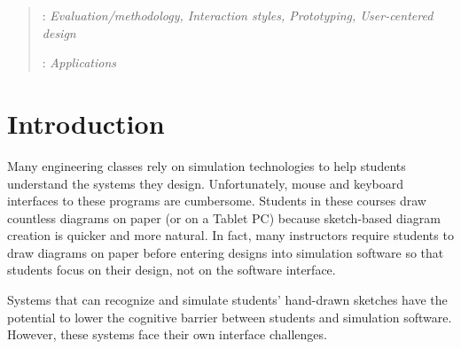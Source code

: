 \documentclass{egpubl}
\begin{document}
\begin{abstract}
\begin{classification} %
: \textit{Evaluation/methodology, Interaction styles, Prototyping, User-centered design}
\end{classification}

\begin{classification} %
: \textit{Applications}
\end{classification}




\end{abstract}


\section{Introduction}

Many engineering classes rely on simulation technologies to help
students understand the systems they design.  Unfortunately, mouse and
keyboard interfaces to these programs are cumbersome.  Students in
these courses draw countless diagrams on paper (or on a Tablet PC)
because sketch-based diagram creation is quicker and more natural.  
In fact, many instructors require students to draw 
diagrams on paper before entering designs into simulation software so
that students focus on their design, not on the software interface.

Systems that can recognize and simulate students' hand-drawn sketches
have the potential to lower the cognitive barrier between students and
simulation software.  However, these systems face their own interface
challenges.
\end{document}

